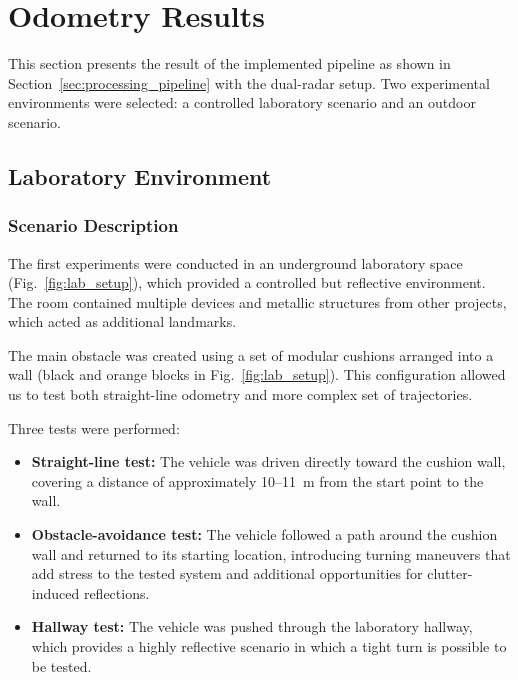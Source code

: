 \newpage
\section{Odometry Results}
\label{sec:odometry_results}

This section presents the result of the implemented pipeline as shown in Section~\ref{sec:processing_pipeline} with the dual-radar setup.
Two experimental environments were selected: a controlled laboratory scenario and an outdoor scenario. 

\subsection{Laboratory Environment}
\subsubsection{Scenario Description}

The first experiments were conducted in an underground laboratory space (Fig.~\ref{fig:lab_setup}), which provided a controlled but reflective environment.  
The room contained multiple devices and metallic structures from other projects, which acted as additional landmarks.  

The main obstacle was created using a set of modular cushions arranged into a wall (black and orange blocks in Fig.~\ref{fig:lab_setup}).  
This configuration allowed us to test both straight-line odometry and more complex set of trajectories.

Three tests were performed:
\begin{itemize}
    \item \textbf{Straight-line test:} The vehicle was driven directly toward the cushion wall, covering a distance of approximately 10--11~m from the start point to the wall.  
    \item \textbf{Obstacle-avoidance test:} The vehicle followed a path around the cushion wall and returned to its starting location, introducing turning maneuvers that add stress to the tested system and additional opportunities for clutter-induced reflections. 
    \item \textbf{Hallway test:} The vehicle was pushed through the laboratory hallway, which provides a highly reflective scenario in which a tight turn is possible to be tested.
\end{itemize}

